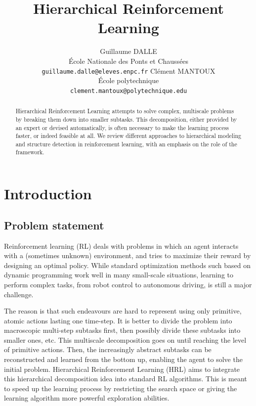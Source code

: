 \documentclass{article}
\title{Hierarchical Reinforcement Learning}
\author{%
  Guillaume DALLE \\
  École Nationale des Ponts et Chaussées \\
  \texttt{guillaume.dalle@eleves.enpc.fr} 
  \And
  Clément MANTOUX \\
  École polytechnique \\
  \texttt{clement.mantoux@polytechnique.edu}
}
\begin{document}

\maketitle

\begin{abstract}

Hierarchical Reinforcement Learning attempts to solve complex, multiscale problems by breaking them down into smaller subtasks. This decomposition, either provided by an expert or devised automatically, is often necessary to make the learning process faster, or indeed feasible at all. We review different approaches to hierarchical modeling and structure detection in reinforcement learning, with an emphasis on the role of the framework.

\end{abstract}

\section{Introduction}  \label{intro}

\subsection{Problem statement}

Reinforcement learning (RL) deals with problems in which an agent interacts with a (sometimes unknown) environment, and tries to maximize their reward by designing an optimal policy. While standard optimization methods such based on dynamic programming work well in many small-scale situations, learning to perform complex tasks, from robot control to autonomous driving, is still a major challenge.

The reason is that such endeavours are hard to represent using only primitive, atomic actions lasting one time-step. It is better to divide the problem into macroscopic multi-step subtasks first, then possibly divide these subtasks into smaller ones, etc.  This multiscale decomposition goes on until reaching the level of primitive actions. Then, the increasingly abstract subtasks can be reconstructed and learned from the bottom up, enabling the agent to solve the initial problem. 
Hierarchical Reinforcement Learning (HRL) aims to integrate this hierarchical decomposition idea into standard RL algorithms. This is meant to speed up the learning process by restricting the search space or giving the learning algorithm more powerful exploration abilities. 
\end{document}
